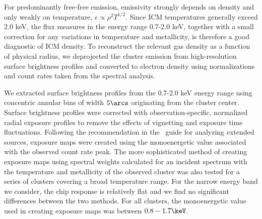 For predominantly free-free emission, emissivity strongly depends on
density and only weakly on temperature, $\epsilon \propto \rho^2
T^{1/2}$. Since ICM temperatures generally exceed 2.0 keV, the flux
measures in the energy range 0.7-2.0 keV, together with a small
correction for any variations in temperature and metallicity, is
therefore a good diagnostic of ICM density. To reconstruct the
relevant gas density as a function of physical radius, we deprojected
the cluster emission from high-resolution surface brightness profiles
and converted to electron density using normalizations and count rates
taken from the spectral analysis.

We extracted surface brightness profiles from the 0.7-2.0 keV energy
range using concentric annular bins of width $5\arcs$ originating from
the cluster center. Surface brightness profiles were corrected with
observation-specific, normalized radial exposure profiles to remove
the effects of vignetting and exposure time fluctuations. Following
the recommendation in the \ciao\ guide for analyzing extended sources,
exposure maps were created using the monoenergetic value associated
with the observed count rate peak. The more sophisticated method of
creating exposure maps using spectral weights calculated for an
incident spectrum with the temperature and metallicity of the observed
cluster was also tested for a series of clusters covering a broad
temperature range. For the narrow energy band we consider, the chip
response is relatively flat and we find no significant differences
between the two methods. For all clusters, the monoenergetic value
used in creating exposure maps was between $0.8-1.7\keV$.

